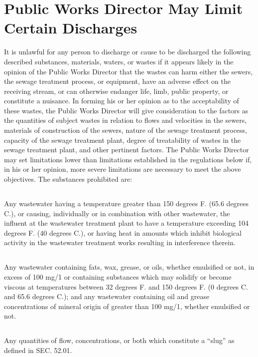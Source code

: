 \section{Public Works Director May Limit Certain Discharges}
It is unlawful for any person to discharge or cause to be discharged the following described substances, materials, waters, or wastes if it appears likely in the opinion of the Public Works Director that the wastes can harm either the sewers, the sewage treatment process, or equipment, have an adverse effect on the receiving stream, or can otherwise endanger life, limb, public property, or constitute a nuisance. In forming his or her opinion as to the acceptability of these wastes, the Public Works Director will give consideration to the factors as the quantities of subject wastes in relation to flows and velocities in the sewers, materials of construction of the sewers, nature of the sewage treatment process, capacity of the sewage treatment plant, degree of treatability of wastes in the sewage treatment plant, and other pertinent factors. The Public Works Director may set limitations lower than limitations established in the regulations below if, in his or her opinion, more severe limitations are necessary to meet the above objectives. The substances prohibited are:
\subsection{}
Any wastewater having a temperature greater than 150 degrees F. (65.6 degrees C.), or causing, individually or in combination with other wastewater, the influent at the wastewater treatment plant to have a temperature exceeding 104 degrees F. (40 degrees C.), or having heat in amounts which inhibit biological activity in the wastewater treatment works resulting in interference therein.
\subsection{}
Any wastewater containing fats, wax, grease, or oils, whether emulsified or not, in excess of 100 mg/1 or containing substances which may solidify or become viscous at temperatures between 32 degrees F. and 150 degrees F. (0 degrees C. and 65.6 degrees C.); and any wastewater containing oil and grease concentrations of mineral origin of greater than 100 mg/1, whether emulsified or not.
\subsection{}
Any quantities of flow, concentrations, or both which constitute a “slug” as defined in SEC. 52.01.
